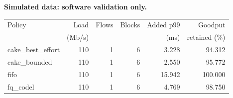 {\small
\textbf{Simulated data: software validation only.}\par
\begin{tabular}{@{}lrrrrr@{}}
\hline
Policy & Load & Flows & Blocks & Added p99 & Goodput \\
 & (Mb/s) & & & (ms) & retained (\%) \\
\hline
cake\_best\_effort & 110 & 1 & 6 & 3.228 & 94.312 \\
cake\_bounded & 110 & 1 & 6 & 2.550 & 95.772 \\
fifo & 110 & 1 & 6 & 15.942 & 100.000 \\
fq\_codel & 110 & 1 & 6 & 4.769 & 98.750 \\
\hline
\end{tabular}
}

